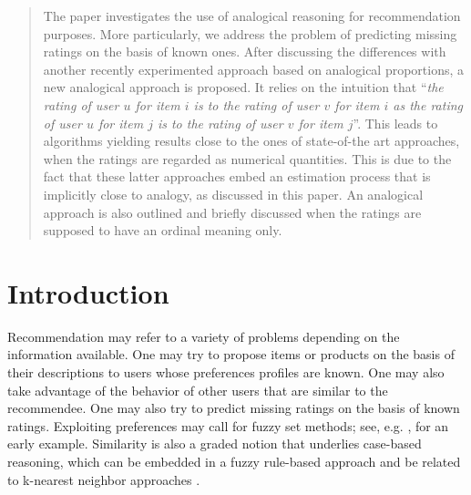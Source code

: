 \documentclass[conference]{IEEEtran}
\begin{document}




\maketitle

\begin{abstract}
The paper investigates the use of analogical reasoning for recommendation
purposes. More particularly, we address the problem of predicting
missing ratings on the basis of known ones. After
discussing the differences with another recently experimented approach based on
analogical proportions, a new analogical approach is proposed. It relies on
the intuition that ``\textit{the rating of user $u$ for item $i$ is to the
  rating of user $v$ for item $i$ as the rating of user $u$ for item $j$ is to
the rating of user $v$ for item $j$}''.  This leads to algorithms yielding
results close to the ones of state-of-the art approaches, when the ratings are
regarded as numerical quantities. This is due to the fact that these latter
approaches embed an estimation process that is 
implicitly close to analogy, as discussed in this paper.
An analogical
approach is also outlined and briefly discussed when the ratings are
supposed to have an ordinal meaning only.
\end{abstract}





%
\IEEEpeerreviewmaketitle



\section{Introduction}
Recommendation may refer to a variety of problems depending on the information
available. One may  try to propose items or products on the basis of their
descriptions to users whose preferences profiles are known.  One may also
take advantage of the  behavior of other users that are similar to the
recommendee. One may also  try
to predict missing ratings on the basis of  known ratings.
 Exploiting preferences may call for fuzzy set
methods; see, e.g. \cite{Perny}, for an early example. Similarity is also a
graded notion that underlies case-based reasoning, which can be embedded in a
fuzzy rule-based approach and be related to k-nearest neighbor approaches
\cite{DHP02,HDP02,DHP06}.
\end{document}
